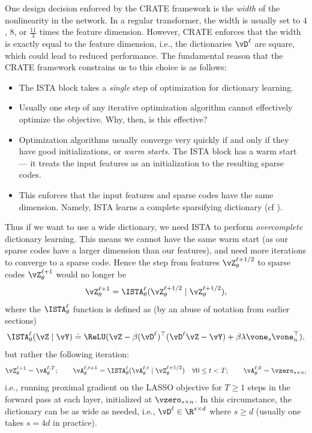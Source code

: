 \documentclass[../../book-main.tex]{subfiles}
\begin{document}
One design decision enforced by the CRATE framework is the
\textit{width} of the nonlinearity in the network. In a regular
transformer, the width is usually set to \(4\), \(8\), or
\(\frac{11}{3}\) times the feature dimension. However, CRATE enforces
that the width is exactly equal to the feature dimension, i.e., the
dictionaries \(\vD^{\ell}\) are square, which could lead to reduced
performance. The fundamental reason that the CRATE framework
constrains us to this choice is as follows:
\begin{itemize}
\item The ISTA block takes a \textit{single} step of optimization for
dictionary learning.
\item Usually one step of any iterative optimization algorithm cannot
effectively optimize the objective. Why, then, is this effective?
\item Optimization algorithms usually converge very quickly if and
only if they have good initializations, or \textit{warm starts}. The
ISTA block has a warm start --- it treats the input features as an
initialization to the resulting sparse codes.
\item This enforces that the input features and sparse codes have the
same dimension. Namely, ISTA learns a complete sparsifying dictionary
(cf ).
\end{itemize}
Thus if we want to use a wide dictionary, we need ISTA to perform
\textit{overcomplete} dictionary learning. This means we cannot have
the same warm start (as our sparse codes have a larger dimension than
our features), and need more iterations to converge to a sparse code.
Hence the step from features \(\vZ_{\theta}^{\ell + 1/2}\) to sparse
codes \(\vZ_{\theta}^{\ell + 1}\) would no longer be
\begin{equation}
\vZ_{\theta}^{\ell + 1} = \ISTA_{\theta}^{\ell}(\vZ_{\theta}^{\ell +
1/2} \mid \vZ_{\theta}^{\ell + 1/2}) ,
\end{equation}
where the \(\ISTA_{\theta}^{\ell}\) function is defined as (by an
abuse of notation from earlier sections)
\begin{equation}
\ISTA_{\theta}^{\ell}(\vZ \mid \vY) \doteq \ReLU(\vZ - \beta
(\vD^{\ell})^{\top}(\vD^{\ell}\vZ - \vY) + \beta \lambda
\vone_{s}\vone_{n}^{\top}) ,
\end{equation}
but rather the following iteration:
\begin{equation}
\vZ_{\theta}^{\ell + 1} = \vA_{\theta}^{\ell, T};
\qquad
\vA_{\theta}^{\ell, t + 1} =
\ISTA_{\theta}^{\ell}(\vA_{\theta}^{\ell, t} \mid \vZ_{\theta}^{\ell
+ 1/2}) \quad \forall 0 \leq t < T;
\qquad \vA_{\theta}^{\ell, 0} =
\vzero_{s \times n},
\end{equation}
i.e., running proximal gradient on the LASSO objective for \(T \geq
1\) steps in the forward pass at each layer, initialized at
\(\vzero_{s \times n}\). In this circumstance, the dictionary can be
as wide as needed, i.e., \(\vD^{\ell} \in \R^{s \times d}\) where \(s
\geq d\) (usually one takes \(s = 4d\) in practice).
\end{document}
